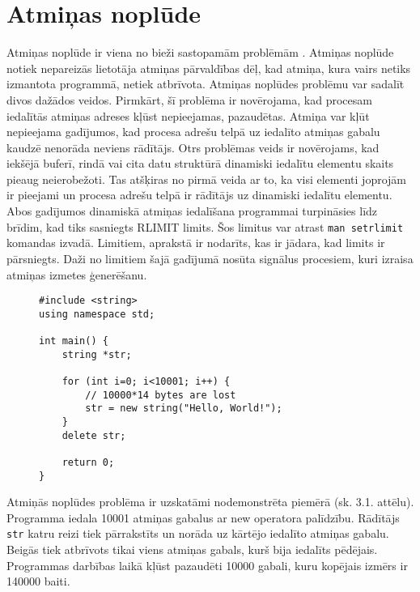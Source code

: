﻿\section{Atmiņas noplūde}


Atmiņas noplūde ir viena no bieži sastopamām problēmām \cite{atparv}.
Atmiņas noplūde notiek nepareizās lietotāja atmiņas pārvaldības dēļ, kad atmiņa, kura vairs netiks izmantota programmā, netiek atbrīvota.
Atmiņas noplūdes problēmu var sadalīt divos dažādos veidos.
Pirmkārt, šī problēma ir novērojama, kad procesam iedalītās atmiņas adreses kļūst nepieejamas, pazaudētas.
Atmiņa var kļūt nepieejama gadījumos, kad procesa adrešu telpā uz iedalīto atmiņas gabalu kaudzē nenorāda neviens rādītājs.
Otrs problēmas veids ir novērojams, kad iekšējā buferī, rindā vai cita datu struktūrā dinamiski iedalītu elementu skaits pieaug neierobežoti.
Tas atšķiras no pirmā veida ar to, ka visi elementi joprojām ir pieejami un procesa adrešu telpā ir rādītājs uz dinamiski iedalītu elementu.
Abos gadījumos dinamiskā atmiņas iedalīšana programmai turpināsies līdz brīdim, kad  tiks sasniegts RLIMIT limits.
Šos limitus var atrast \texttt{man setrlimit} komandas izvadā. 
Limitiem, aprakstā ir nodarīts, kas ir jādara, kad limits ir pārsniegts.
Daži no limitiem šajā gadījumā nosūta signālus procesiem, kuri izraisa atmiņas izmetes ģenerēšanu.
\begin{figure}[h]
\begin{lstlisting}
#include <string>
using namespace std;

int main() {
    string *str;

    for (int i=0; i<10001; i++) {
        // 10000*14 bytes are lost
        str = new string("Hello, World!");
    }
    delete str;

    return 0;
}
\end{lstlisting}
\caption{\textbf{\fontsize{11}{12}\selectfont {Atmiņas noplūde, C++}}}
\end{figure}

Atmiņās noplūdes problēma ir uzskatāmi nodemonstrēta piemērā (sk. 3.1. attēlu).
Programma  iedala 10001 atmiņas gabalus ar new operatora palīdzību. 
Rādītājs \texttt{str} katru reizi tiek pārrakstīts un norāda uz kārtējo iedalīto atmiņas gabalu.
Beigās tiek atbrīvots tikai viens atmiņas gabals, kurš bija iedalīts pēdējais. 
Programmas darbības laikā kļūst pazaudēti 10000 gabali, kuru kopējais izmērs ir 140000 baiti.
 


